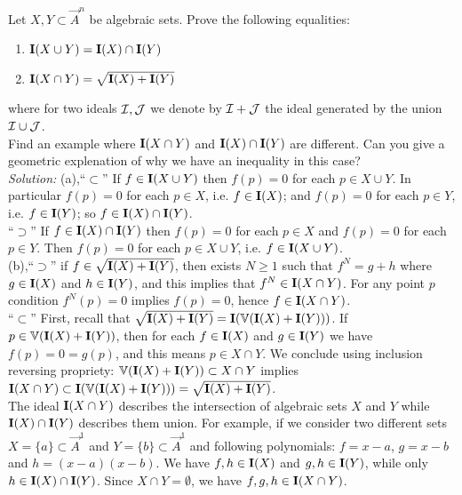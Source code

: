 \documentclass[../main/main.tex]{subfiles}
\begin{document}
\begin{ex}
Let $X,Y\subset\vec A^n$ be algebraic sets. Prove the following equalities:
\begin{enumerate}[label=(\alph*)]
\item $\mathbf I(X\cup Y)=\mathbf I(X)\cap \mathbf I(Y)$
\item $\mathbf I(X\cap Y)=\sqrt{\mathbf I(X)+\mathbf I(Y)}$
\end{enumerate}
where for two ideals $\mathcal I, \mathcal J$ we denote by $\mathcal I+\mathcal J$ the ideal generated by the union $\mathcal I\cup\mathcal J$.\\
Find an example where $\mathbf I(X\cap Y)$ and $\mathbf I(X)\cap \mathbf I(Y)$ are different. Can you give a geometric explenation of why we have an inequality in this case?\\
%
\textit{Solution:}
%
(a),``$\subset$'' If $f\in \mathbf I(X\cup Y)$ then $f(p)=0$ for each $p\in X\cup Y$. In particular $f(p)=0$ for each $p\in X$, i.e. $f\in\mathbf I(X)$; and $f(p)=0$ for each $p\in Y$, i.e. $f\in\mathbf I(Y)$; so $f\in  \mathbf I(X)\cap \mathbf I(Y)$.\\
``$\supset$'' If $f\in  \mathbf I(X)\cap \mathbf I(Y)$ then $f(p)=0$ for each $p\in X$ and $f(p)=0$ for each $p\in Y$. Then $f(p)=0$ for each $p\in X\cup Y$, i.e. $f\in \mathbf I(X\cup Y)$.\\
(b),``$\supset$'' if $f\in \sqrt{\mathbf I(X)+\mathbf I(Y)}$, then exists $N\geq1$ such that $f^N=g+h$ where $g\in\mathbf I(X)$ and $h\in\mathbf I(Y)$, and this implies that $f^N\in \mathbf I(X\cap Y)$. For any point $p$ condition $f^N(p)=0$ implies $f(p)=0$, hence $f\in \mathbf I(X\cap Y)$. \\
``$\subset$'' First, recall that $\sqrt{\mathbf I(X)+\mathbf I(Y)}=\mathbf I(\mathbb V({\mathbf I(X)+\mathbf I(Y)}))$. If $p\in \mathbb V({\mathbf I(X)+\mathbf I(Y)})$, then for each $f\in \mathbf I(X)$ and $g\in\mathbf I(Y)$ we have $f(p)=0=g(p)$, and this means $p\in X\cap Y$. We conclude using inclusion reversing propriety: $\mathbb V({\mathbf I(X)+\mathbf I(Y)})\subset X\cap Y$ implies $\mathbf I(X\cap Y)\subset\mathbf I(\mathbb V({\mathbf I(X)+\mathbf I(Y)}))=\sqrt{\mathbf I(X)+\mathbf I(Y)}$.\\
The ideal $\mathbf I(X\cap Y)$ describes the intersection of algebraic sets $X$ and $Y$ while $\mathbf I(X)\cap \mathbf I(Y)$ describes them union. For example, if we consider two different sets $X=\{a\}\subset\vec A^1$ and $Y=\{b\}\subset\vec A^1$ and following polynomials: $f=x-a$, $g=x-b$ and $h=(x-a)(x-b)$. We have $f,h\in \mathbf I(X)$ and $g,h\in\mathbf I(Y)$, while only $h\in \mathbf I(X)\cap \mathbf I(Y)$. Since $X\cap Y=\emptyset$, we have $f,g,h\in\mathbf I(X\cap Y)$.
\end{ex}
\end{document}
